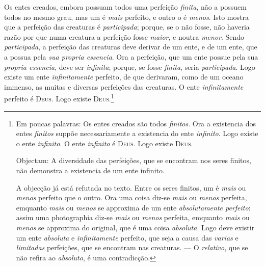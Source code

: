  Os entes creados, embora possuam todos uma perfeição \emph{finita}, não a
possuem todos no mesmo grau, mas um é \emph{mais} perfeito, e outro o é \emph{menos}.
Isto mostra que a perfeição das creaturas é \emph{participada}; porque, se o não fosse,
não haveria razão por que numa creatura a perfeição fosse \emph{maior}, e noutra
\emph{menor}. Sendo \emph{participada}, a perfeição das creaturas deve derivar de um
ente, e de um ente, que a possua pela \emph{sua propria essencia}. Ora a perfeição, que
um ente possue pela sua \emph{propria essencia}, deve ser \emph{infinita}; porque, se
fosse \emph{finita}, seria \emph{participada}. Logo existe um ente \emph{infinitamente}
perfeito, de que derivaram, como de um oceano immenso, as muitas e diversas perfeições
das creaturas. O ente \emph{infinitamente} perfeito é \textsc{Deus}. Logo existe
\textsc{Deus}.\footnote{Em poucas palavras: Os entes creados são todos \emph{finitos}. Ora a existencia dos
entes \emph{finitos} suppõe necessariamente a existencia do ente \emph{infinito}. Logo
existe o ente \emph{infinito}. O ente \emph{infinito} é \textsc{Deus}. Logo existe
\textsc{Deus}.

Objectam: A diversidade das perfeições, que se encontram nos seres finitos, não
demonstra a existencia de um ente infinito.

A objecção já está refutada no texto. Entre os seres finitos, um é \emph{mais} ou
\emph{menos} perfeito que o outro. Ora uma coisa diz-se \emph{mais} ou \emph{menos}
perfeita, emquanto \emph{mais} ou \emph{menos} se approxima de um ente
\emph{absolutamente perfeito}: assim uma photographia diz-se \emph{mais} ou \emph{menos}
perfeita, emquanto \emph{mais} ou \emph{menos} se approxima do original, que é uma coisa
\emph{absoluta}. Logo deve existir um ente \emph{absoluta} e \emph{infinitamente}
perfeito, que seja a causa das \emph{varias} e \emph{limitadas} perfeições, que se
encontram nas creaturas. --- O \emph{relativo}, que se não refira ao \emph{absoluto}, é
uma contradicção.}

